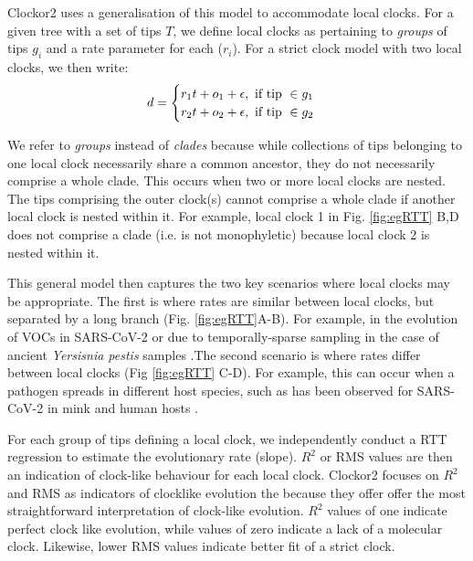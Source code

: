 \documentclass{article}
\begin{document}
Clockor2 uses a generalisation of this model to accommodate local clocks. For a given tree with a set of tips $T$, we define local clocks as pertaining to \textit{groups} of tips $g_i$ and a rate parameter for each ($r_i$). For a strict clock model with two local clocks, we then write:
\begin{equation*}
    d = 
    \begin{cases}
    r_{1}t + o_{1} + \epsilon, \textnormal{ if tip }\in g_1\\
    r_{2}t + o_{2} + \epsilon, \textnormal{ if tip }\in g_2
    
    \end{cases}
\end{equation*}

We refer to \emph{groups} instead of \emph{clades} because while collections of tips belonging to one local clock necessarily share a common ancestor, they do not necessarily comprise a whole clade. This occurs when two or more local clocks are nested. The tips comprising the outer clock(s) cannot comprise a whole clade if another local clock is nested within it. For example, local clock 1 in Fig. \ref{fig:egRTT} B,D does not comprise a clade (i.e. is not monophyletic) because local clock 2 is nested within it.

This general model then captures the two key scenarios where local clocks may be appropriate. The first is where rates are similar between local clocks, but separated by a long branch (Fig. \ref{fig:egRTT}A-B). For example, in the evolution of VOCs in SARS-CoV-2 or due to temporally-sparse sampling in the case of ancient \textit{Yersisnia pestis} samples \citep{tay2022emergence, eaton2023plagued,hill_origins_2022}.The second scenario is where rates differ between local clocks (Fig \ref{fig:egRTT} C-D). For example, this can occur when a pathogen spreads in different host species, such as has been observed for SARS-CoV-2 in mink and human hosts \citep{porter2023evolutionary}.

For each group of tips defining a local clock, we independently conduct a RTT regression to estimate the evolutionary rate (slope). $R^2$ or RMS values are then an indication of clock-like behaviour for each local clock. Clockor2 focuses on $R^2$ and RMS as indicators of clocklike evolution the because they offer offer the most straightforward interpretation of clock-like evolution. $R^2$ values of one indicate perfect clock like evolution, while values of zero indicate a lack of a molecular clock. Likewise, lower RMS values indicate better fit of a strict clock.
\end{document}
